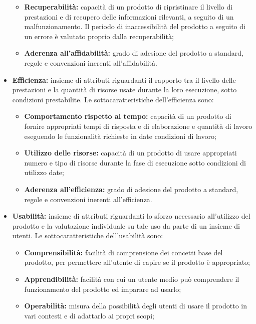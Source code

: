 \begin{itemize}
\begin{itemize}
              \item \textbf{Recuperabilità:} capacità di un prodotto di ripristinare il livello di prestazioni e di recupero delle informazioni rilevanti, a seguito di un malfunzionamento. Il periodo di inaccessibilità del prodotto a seguito di un errore è valutato proprio dalla recuperabilità;
              \item \textbf{Aderenza all'affidabilità:} grado di adesione del prodotto a standard, regole e convenzioni inerenti all'affidabilità.
          \end{itemize}
    \item \textbf{Efficienza:} insieme di attributi riguardanti il rapporto tra il livello delle prestazioni e la quantità di risorse usate durante la loro esecuzione, sotto condizioni prestabilite.
          Le sottocaratteristiche dell'efficienza sono:
          \begin{itemize}
              \item \textbf{Comportamento rispetto al tempo:} capacità di un prodotto di fornire appropriati tempi di risposta e di elaborazione e quantità di lavoro eseguendo le funzionalità richieste in date condizioni di lavoro;
              \item \textbf{Utilizzo delle risorse:} capacità di un prodotto di usare appropriati numero e tipo di risorse durante la fase di esecuzione sotto condizioni di utilizzo date;
              \item \textbf{Aderenza all'efficienza:} grado di adesione del prodotto a standard, regole e convenzioni inerenti all'efficienza.
          \end{itemize}
    \item \textbf{Usabilità:} insieme di attributi riguardanti lo sforzo necessario all'utilizzo del prodotto e la valutazione individuale su tale uso da parte di un insieme di utenti.
          Le sottocaratteristiche dell'usabilità sono:
          \begin{itemize}
              \item \textbf{Comprensibilità:} facilità di comprensione dei concetti base del prodotto, per permettere all'utente di capire se il prodotto è appropriato;
              \item \textbf{Apprendibilità:} facilità con cui un utente medio può comprendere il funzionamento del prodotto ed imparare ad usarlo;
              \item \textbf{Operabilità:} misura della possibilità degli utenti di usare il prodotto in vari contesti e di adattarlo ai propri scopi;

\end{itemize}
\end{itemize}
